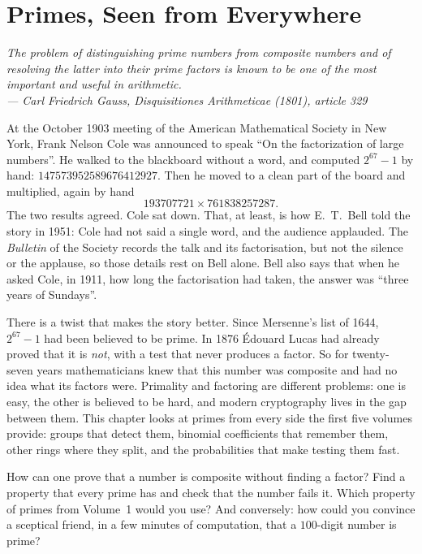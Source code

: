 \chapter{Primes, Seen from Everywhere}

\begin{center}\itshape
The problem of distinguishing prime numbers from composite numbers and of resolving the latter into their prime factors is
known to be one of the most important and useful in arithmetic.\\
\upshape --- Carl Friedrich Gauss, \emph{Disquisitiones Arithmeticae} (1801), article 329
\end{center}

At the October 1903 meeting of the American Mathematical Society in New York, Frank Nelson Cole was announced to speak
``On the factorization of large numbers''. He walked to the blackboard without a word, and computed $2^{67}-1$ by hand:
$147573952589676412927$. Then he moved to a clean part of the board and multiplied, again by hand
\[
193707721\times761838257287.
\]
The two results agreed. Cole sat down. That, at least, is how E.~T.~Bell told the story in 1951: Cole had not said a single
word, and the audience applauded. The \emph{Bulletin} of the Society records the talk and its factorisation, but not the
silence or the applause, so those details rest on Bell alone. Bell also says that when he asked Cole, in 1911, how long the
factorisation had taken, the answer was ``three years of Sundays''.

There is a twist that makes the story better. Since Mersenne's list of 1644, $2^{67}-1$ had been believed to be prime. In
1876 Édouard Lucas had already proved that it is \emph{not}, with a test that never produces a factor. So for twenty-seven
years mathematicians knew that this number was composite and had no idea what its factors were. Primality and factoring
are different problems: one is easy, the other is believed to be hard, and modern cryptography lives in the gap between
them. This chapter looks at primes from every side the first five volumes provide: groups that detect them, binomial
coefficients that remember them, other rings where they split, and the probabilities that make testing them fast.

\begin{think}
How can one prove that a number is composite without finding a factor? Find a property that every prime has and check
that the number fails it. Which property of primes from Volume~1 would you use? And conversely: how could you convince a
sceptical friend, in a few minutes of computation, that a $100$-digit number is prime?
\end{think}

